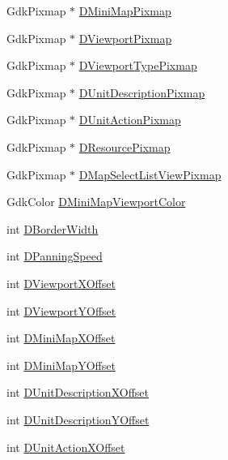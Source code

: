 \begin{DoxyCompactItemize}
\item 
Gdk\+Pixmap $\ast$ \hyperlink{classCApplicationData_abe3af81659ead5113b7b2f165a88e737}{D\+Mini\+Map\+Pixmap}
\item 
Gdk\+Pixmap $\ast$ \hyperlink{classCApplicationData_ac8801e116d0c49776c9f3db7415287fe}{D\+Viewport\+Pixmap}
\item 
Gdk\+Pixmap $\ast$ \hyperlink{classCApplicationData_a3a71a311e7bf0d4a002412343f69e794}{D\+Viewport\+Type\+Pixmap}
\item 
Gdk\+Pixmap $\ast$ \hyperlink{classCApplicationData_a52e5c1a2ac452c82580ba3f4978c3501}{D\+Unit\+Description\+Pixmap}
\item 
Gdk\+Pixmap $\ast$ \hyperlink{classCApplicationData_ae264356c833cd581093e3b373cce6620}{D\+Unit\+Action\+Pixmap}
\item 
Gdk\+Pixmap $\ast$ \hyperlink{classCApplicationData_aa9faf270fb2d769855fa5d787a883a83}{D\+Resource\+Pixmap}
\item 
Gdk\+Pixmap $\ast$ \hyperlink{classCApplicationData_a76e4af228d69ca3c6b1cf0770ca2e7a0}{D\+Map\+Select\+List\+View\+Pixmap}
\item 
Gdk\+Color \hyperlink{classCApplicationData_a9a19207b43eece4000159fb1f1d831c3}{D\+Mini\+Map\+Viewport\+Color}
\item 
int \hyperlink{classCApplicationData_a566b69c72fa982c6ecf8e47dc21df489}{D\+Border\+Width}
\item 
int \hyperlink{classCApplicationData_a9e07e8374b20abfbb57f656e92be8404}{D\+Panning\+Speed}
\item 
int \hyperlink{classCApplicationData_a306bba873ccc47126111305fe21ef3ff}{D\+Viewport\+X\+Offset}
\item 
int \hyperlink{classCApplicationData_afc58ed96a1af813b28f6abf2c7d2dc72}{D\+Viewport\+Y\+Offset}
\item 
int \hyperlink{classCApplicationData_ae651b9d3963288c5c1f5aaf53bf9401d}{D\+Mini\+Map\+X\+Offset}
\item 
int \hyperlink{classCApplicationData_ad33fc850bd8262a4bdf1f23e9477d5ad}{D\+Mini\+Map\+Y\+Offset}
\item 
int \hyperlink{classCApplicationData_a5653b5d0eff32ccd540ad60f5c331c24}{D\+Unit\+Description\+X\+Offset}
\item 
int \hyperlink{classCApplicationData_a6c60b2da482699f1d998acfe24fec332}{D\+Unit\+Description\+Y\+Offset}
\item 
int \hyperlink{classCApplicationData_aa47b53d283617575a4866c08d83e27c4}{D\+Unit\+Action\+X\+Offset}
\item 

\end{DoxyCompactItemize}
